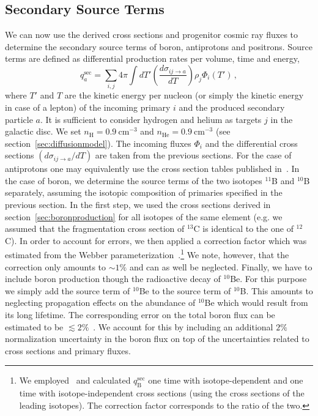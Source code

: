 \documentclass[a4paper,11pt]{article}
\newcommand{\cm}{\:\text{cm}}
\begin{document}
\subsection{Secondary Source Terms}

We can now use the derived cross sections and progenitor cosmic ray fluxes to determine the secondary source terms of boron, antiprotons and positrons. Source terms are defined as differential production rates per volume, time and energy,
\begin{equation}\label{eq:secsource}
 q_a^\text{sec} = \sum\limits_{i,j} 4\pi \int dT' \left(\frac{d\sigma_{ij\rightarrow a}}{dT}\right) \rho_{j} \Phi_i(T')\,,
\end{equation}
where $T'$ and $T$ are the kinetic energy per nucleon (or simply the kinetic energy in case of a lepton) of the incoming primary $i$ and the produced secondary particle $a$. It is sufficient to consider hydrogen and helium as targets $j$ in the galactic disc. We set $n_{\text{H}}=0.9\cm^{-3}$ and $n_{\text{He}}=0.9\cm^{-3}$ (see section~\ref{sec:diffusionmodel}). The incoming fluxes $\Phi_i$ and the differential cross sections $(d\sigma_{ij\rightarrow a}/dT)$ are taken from the previous sections. For the case of antiprotons one may equivalently use the cross section tables published in~\cite{Winkler:2017xor}. In the case of boron, we determine the source terms of the two isotopes $^{11}$B and $^{10}$B separately, assuming the isotopic composition of primaries specified in the previous section. In the first step, we used the cross sections derived in section~\ref{sec:boronproduction} for all isotopes of the same element (e.g. we assumed that the fragmentation cross section of $^{13}$C is identical to the one of $^{12}$C). In order to account for errors, we then applied a correction factor which was estimated from the Webber parameterization~\cite{Webber:2003}.\footnote{We employed~\cite{Webber:2003} and calculated $q_{\text{B}}^{\text{sec}}$ one time with isotope-dependent and one time with isotope-independent cross sections (using the cross sections of the leading isotopes). The correction factor corresponds to the ratio of the two.} We note, however, that the correction only amounts to $\sim 1\%$ and can as well be neglected. Finally, we have to include boron production though the radioactive decay of $^{10}$Be. For this purpose we simply add the source term of $^{10}$Be to the source term of $^{10}$B. This amounts to neglecting propagation effects on the abundance of $^{10}$Be which would result from its long lifetime. The corresponding error on the total boron flux can be estimated to be $\lesssim 2\%$~\cite{Maurin:2002ua}. We account for this by including an additional $2\%$ normalization uncertainty in the boron flux on top of the uncertainties related to cross sections and primary fluxes. 
\end{document}
